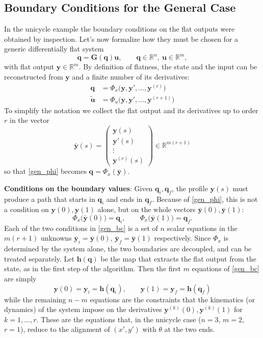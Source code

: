 \documentclass[10pt, a4paper]{report}
\newcommand{\y}{{\mathbf y}}
\newcommand{\q}{{\mathbf q}}
\begin{document}
\subsection{Boundary Conditions for the General Case}
In the unicycle example the boundary conditions on the flat outputs were obtained by inspection. Let's now formalize how they must be chosen for a generic differentially flat system
\begin{equation}
    \dot{\q}=\mathbf{G}(\q)\mathbf{u},\qquad \q\in\mathbb{R}^n,\ \mathbf{u}\in\mathbb{R}^m,
\end{equation}
with flat output $\y\in\mathbb{R}^m$. By definition of flatness, the state and the input can be reconstructed from $\y$ and a finite number of its derivatives:\begin{align}
    \q&=\Phi_x\big(\y,\y',\dots,\y^{(r)}\big)\label{gen_phi}\\
    \tilde{\mathbf u}&=\Phi_u\big(\y,\y',\dots,\y^{(r+1)}\big)\label{gen_psi}
\end{align}
To simplify the notation we collect the flat output and its derivatives up to order $r$ in the vector
\begin{equation}
    \bar{\y}(s)=\begin{pmatrix}
        \y(s)\\\y'(s)\\\vdots\\\y^{(r)}(s)
    \end{pmatrix}\in\mathbb{R}^{m(r+1)}
\end{equation}
so that \eqref{gen_phi} becomes $\q=\Phi_x(\bar{\y})$.\bigskip

\noindent\textbf{Conditions on the boundary values}:
Given $\q_i,\q_f$, the profile $\y(s)$ must produce a path that starts in $\q_i$ and ends in $\q_f$. Because of \eqref{gen_phi}, this is not a condition on $\y(0),\y(1)$ alone, but on the whole vectors $\bar{\y}(0),\bar{\y}(1)$:\begin{equation}
    \Phi_x\big(\bar{\y}(0)\big)=\q_i,\qquad \Phi_x\big(\bar{\y}(1)\big)=\q_f.\label{gen_bc}
\end{equation}
Each of the two conditions in \eqref{gen_bc} is a set of $n$ scalar equations in the $m(r+1)$ unknowns $\bar{\y}_i=\bar{\y}(0)$, $\bar{\y}_f=\bar{\y}(1)$ respectively. Since $\Phi_x$ is determined by the system alone, the two boundaries are decoupled, and can be treated separately. Let $\mathbf{h}(\q)$ be the map that extracts the flat output from the state, as in the first step of the algorithm. Then the first $m$ equations of \eqref{gen_bc} are simply\begin{equation}
    \y(0)=\y_i=\mathbf{h}(\q_i),\qquad \y(1)=\y_f=\mathbf{h}(\q_f)
\end{equation}
while the remaining $n-m$ equations are the constraints that the kinematics (or dynamics) of the system impose on the derivatives $\y^{(k)}(0),\y^{(k)}(1)$ for $k=1,\dots,r$. These are the equations that, in the unicycle case ($n=3$, $m=2$, $r=1$), reduce to the alignment of $(x',y')$ with $\theta$ at the two ends.\bigskip
\end{document}
